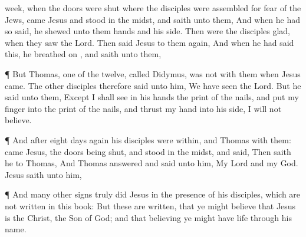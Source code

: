 {week,
when the
doors were
shut
where the
disciples
were
assembled
for
fear of the
Jews,
came
Jesus
and
stood
in the
midst,
and
saith unto
them,
{}
And when he
had
so
said, he
shewed unto
them
{}
hands
and
his
side.
Then
were the
disciples
glad, when they
saw the
Lord.
Then
said
Jesus to
them
again,
{}
And when he had
said
this, he breathed
on
{},
and
saith unto
them,
{}
\par }{\PP {}¶
But
Thomas,
one
of the
twelve,
called
Didymus,
was
not
with
them
when
Jesus
came.
The
other
disciples
therefore
said unto
him, We have
seen the
Lord.
But he
said unto
them,
Except I shall
see
in
his
hands the
print of the
nails,
and
put
my
finger
into the
print of the
nails,
and
thrust
my
hand
into
his
side, I
will
not
believe.
\par }{\PP {}¶
And
after
eight
days
again
his
disciples
were
within,
and
Thomas
with
them:
{}
came
Jesus, the
doors being
shut,
and
stood
in the
midst,
and
said,
{}
Then saith
he to
Thomas,
{}
And
Thomas
answered
and
said unto
him,
My
Lord
and
my
God.
Jesus
saith unto
him,
{}
\par }{\PP {}¶
And
many
other
signs
truly
did
Jesus in the presence
of
his
disciples,
which
are
not
written
in
this
book:
But
these are
written,
that ye might
believe
that
Jesus
is the
Christ, the
Son of
God;
and
that
believing ye might
have
life
through
his
name.

}

